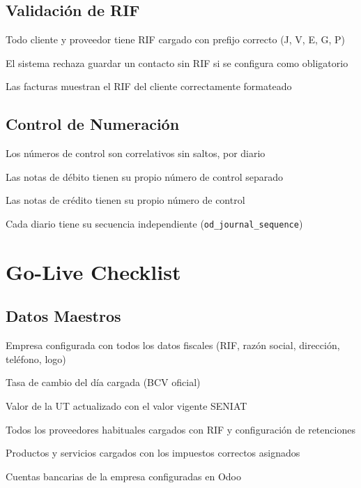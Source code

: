 \documentclass[11pt,a4paper]{article}
\newcommand{\modulo}[1]{\texttt{\textcolor{naranja}{#1}}}
\begin{document}
\begin{Form}
\subsection{Validación de RIF}

\begin{checklist}
  \item Todo cliente y proveedor tiene RIF cargado con prefijo correcto (J, V, E, G, P)
  \item El sistema rechaza guardar un contacto sin RIF si se configura como obligatorio
  \item Las facturas muestran el RIF del cliente correctamente formateado
\end{checklist}

\subsection{Control de Numeración}

\begin{checklist}
  \item Los números de control son correlativos sin saltos, por diario
  \item Las notas de débito tienen su propio número de control separado
  \item Las notas de crédito tienen su propio número de control
  \item Cada diario tiene su secuencia independiente (\modulo{od\_journal\_sequence})
\end{checklist}

\clearpage

\section{Go-Live Checklist}

\subsection*{Datos Maestros}
\begin{checklist}
  \item Empresa configurada con todos los datos fiscales (RIF, razón social, dirección, teléfono, logo)
  \item Tasa de cambio del día cargada (BCV oficial)
  \item Valor de la UT actualizado con el valor vigente SENIAT
  \item Todos los proveedores habituales cargados con RIF y configuración de retenciones
  \item Productos y servicios cargados con los impuestos correctos asignados
  \item Cuentas bancarias de la empresa configuradas en Odoo
\end{checklist}


\end{Form}
\end{document}
